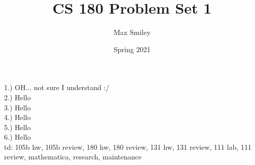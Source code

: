 \documentclass[12pt]{article}
\begin{document}
\title{CS 180 Problem Set 1}
\author{Max Smiley}
\date{Spring 2021}
\maketitle

1.) OH... not sure I understand :/\\
 
2.) Hello\\

3.) Hello\\

4.) Hello\\

5.) Hello\\

6.) Hello\\


td: 105b hw, 105b review, 180 hw, 180 review, 131 hw, 131 review, 111 lab, 111 review, mathematica, research, maintenance
\end{document}
